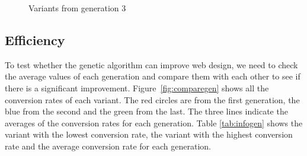 \documentclass{report}
\begin{document}
\begin{figure}[ht]
	
	\caption{Variants from generation 3}
	\label{fig:gen3}
\end{figure}
\FloatBarrier

\subsection{Efficiency}
To test whether the genetic algorithm can improve web design, we need to check the average values of each generation and compare them with each other to see if there is a significant improvement. Figure~\ref{fig:comparegen} shows all the conversion rates of each variant. The red circles are from the first generation, the blue from the second and the green from the last. The three lines indicate the averages of the conversion rates for each generation. Table \ref{tab:infogen} shows the variant with the lowest conversion rate, the variant with the highest conversion rate and the average conversion rate for each generation.\\
\end{document}
